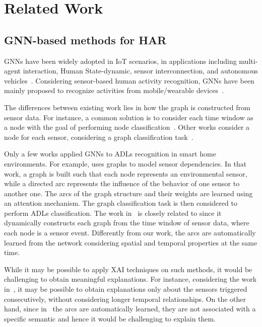 \section{Related Work}

\subsection{GNN-based methods for HAR}
GNNs have been widely adopted in IoT scenarios, in applications including  multi-agent interaction, Human State-dynamic, sensor interconnection, and autonomous vehicles~\cite{10.1145/3565973}.
Considering sensor-based human activity recognition, GNNs have been mainly proposed to recognize activities from mobile/wearable devices~\cite{10174597}.

The differences between existing work lies in how the graph is constructed from sensor data.
For instance, a common solution is to consider each time window as a node with the goal of performing node classification~\cite{9680185,9767342,9874212}.
Other works consider a node for each sensor, considering a graph classification task~\cite{9995660}. 

Only a few works applied GNNs to ADLs recognition in smart home environments. For example, \cite{s24123944} uses graphs to model sensor dependencies. In that work, a graph is built such that each node represents an environmental sensor, while a directed arc represents the influence of the behavior of one sensor to another one. The arcs of the graph structure and their weights are learned using an attention mechanism. The graph classification task is then considered to perform ADLs classification.
The work in~\cite{ye2023graph} is closely related to \acronym{} since it dynamically constructs each graph from the time window of sensor data, where each node is a sensor event. Differently from our work, the arcs are automatically learned from the network considering spatial and temporal properties at the same time.  

While it may be possible to apply XAI techniques on such methods, it would be challenging to obtain meaningful explanations. For instance, considering the work in~\cite{s24123944}, it may be possible to obtain explanations only about the sensors triggered consecutively, without considering longer temporal relationships. On the other hand, since in~\cite{ye2023graph} the arcs are automatically learned, they are not associated with a specific semantic and hence it would be challenging to explain them.


